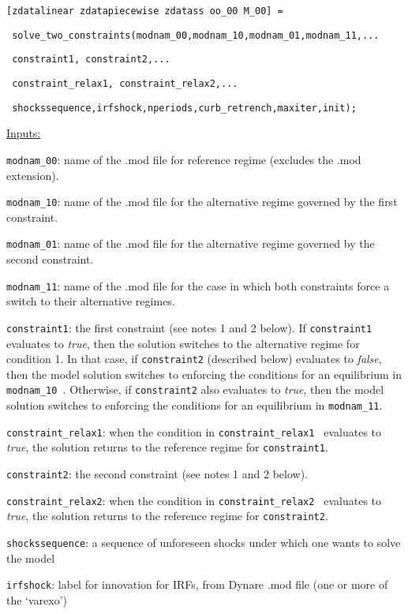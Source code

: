 \documentclass[12pt]{article}
\begin{document}
\begin{enumerate}
\texttt{[zdatalinear zdatapiecewise zdatass oo\_00 M\_00] = }

\texttt{\
solve\_two\_constraints(modnam\_00,modnam\_10,modnam\_01,modnam\_11,...}

\texttt{\ constraint1, constraint2,...}

\texttt{\ constraint\_relax1, constraint\_relax2,...}

\texttt{\ shockssequence,irfshock,nperiods,curb\_retrench,maxiter,init);}

\medskip 

\underline{Inputs:}

\texttt{modnam\_00}: name of the .mod file for reference regime (excludes
the .mod extension).

\texttt{modnam\_10}: name of the .mod file for the alternative regime
governed by the first constraint.

\texttt{modnam\_01}: name of the .mod file for the alternative regime
governed by the second constraint.

\texttt{modnam\_11}: name of the .mod file for the case in which both
constraints force a switch to their alternative regimes.

\texttt{constraint1}: the first constraint (see notes 1 and 2 below). If 
\texttt{constraint1} evaluates to \emph{true}, then the solution switches to
the alternative regime for condition 1. In that case, if \texttt{constraint2}
(described below) evaluates to \emph{false}, then the model solution
switches to enforcing the conditions for an equilibrium in \texttt{modnam\_10%
}. Otherwise, if \texttt{constraint2} also evaluates to \emph{true}, then
the model solution switches to enforcing the conditions for an equilibrium
in \texttt{modnam\_11}.

\texttt{constraint\_relax1}: when the condition in \texttt{constraint\_relax1%
} evaluates to \emph{true}, the solution returns to the reference regime for 
\texttt{constraint1}.

\texttt{constraint2}: the second constraint (see notes 1 and 2 below).

\texttt{constraint\_relax2}: when the condition in \texttt{constraint\_relax2%
} evaluates to \emph{true}, the solution returns to the reference regime for 
\texttt{constraint2}.

\texttt{shockssequence}: a sequence of unforeseen shocks under which one
wants to solve the model

\texttt{irfshock}: label for innovation for IRFs, from Dynare .mod file (one
or more of the `varexo')


\end{enumerate}
\end{document}

